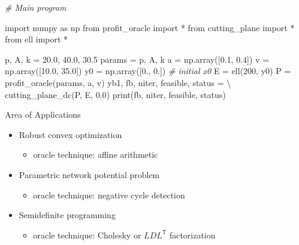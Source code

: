 \documentclass[
  ignorenonframetext,
  aspectratio=169,
  serif,onlymath]{beamer}
\newenvironment{Shaded}{}{}
\newcommand{\BuiltInTok}[1]{#1}
\newcommand{\CommentTok}[1]{\textcolor[rgb]{0.38,0.63,0.69}{\textit{#1}}}
\newcommand{\DecValTok}[1]{\textcolor[rgb]{0.25,0.63,0.44}{#1}}
\newcommand{\FloatTok}[1]{\textcolor[rgb]{0.25,0.63,0.44}{#1}}
\newcommand{\ImportTok}[1]{#1}
\newcommand{\NormalTok}[1]{#1}
\newcommand{\OperatorTok}[1]{\textcolor[rgb]{0.40,0.40,0.40}{#1}}
\providecommand{\tightlist}{%
  \setlength{\itemsep}{0pt}\setlength{\parskip}{0pt}}
\begin{document}
\begin{frame}[fragile]

\scriptsize

\begin{Shaded}
\begin{Highlighting}[]
\CommentTok{# Main program}

\ImportTok{import}\NormalTok{ numpy }\ImportTok{as}\NormalTok{ np}
\ImportTok{from}\NormalTok{ profit_oracle }\ImportTok{import} \OperatorTok{*}
\ImportTok{from}\NormalTok{ cutting_plane }\ImportTok{import} \OperatorTok{*}
\ImportTok{from}\NormalTok{ ell }\ImportTok{import} \OperatorTok{*}

\NormalTok{p, A, k }\OperatorTok{=} \FloatTok{20.0}\NormalTok{, }\FloatTok{40.0}\NormalTok{, }\FloatTok{30.5}
\NormalTok{params }\OperatorTok{=}\NormalTok{ p, A, k}
\NormalTok{a }\OperatorTok{=}\NormalTok{ np.array([}\FloatTok{0.1}\NormalTok{, }\FloatTok{0.4}\NormalTok{])}
\NormalTok{v }\OperatorTok{=}\NormalTok{ np.array([}\FloatTok{10.0}\NormalTok{, }\FloatTok{35.0}\NormalTok{])}
\NormalTok{y0 }\OperatorTok{=}\NormalTok{ np.array([}\FloatTok{0.}\NormalTok{, }\FloatTok{0.}\NormalTok{])  }\CommentTok{# initial x0}
\NormalTok{E }\OperatorTok{=}\NormalTok{ ell(}\DecValTok{200}\NormalTok{, y0)}
\NormalTok{P }\OperatorTok{=}\NormalTok{ profit_oracle(params, a, v)}
\NormalTok{yb1, fb, niter, feasible, status }\OperatorTok{=} \OperatorTok{\textbackslash{}}
\NormalTok{    cutting_plane_dc(P, E, }\FloatTok{0.0}\NormalTok{)}
\BuiltInTok{print}\NormalTok{(fb, niter, feasible, status)}
\end{Highlighting}
\end{Shaded}

\end{frame}

\begin{frame}{Area of Applications}
\protect\hypertarget{area-of-applications}{}

\begin{itemize}
\tightlist
\item
  Robust convex optimization

  \begin{itemize}
  \tightlist
  \item
    oracle technique: affine arithmetic
  \end{itemize}
\item
  Parametric network potential problem

  \begin{itemize}
  \tightlist
  \item
    oracle technique: negative cycle detection
  \end{itemize}
\item
  Semidefinite programming

  \begin{itemize}
  \tightlist
  \item
    oracle technique: Cholesky or \(LDL^\mathsf{T}\) factorization
  \end{itemize}
\end{itemize}

\end{frame}
\end{document}
